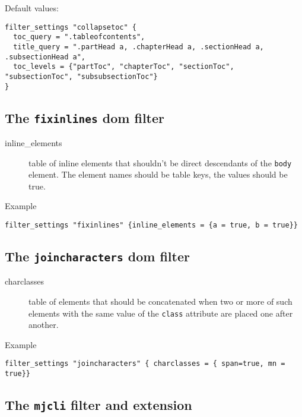 Default values:

\begin{verbatim}
filter_settings "collapsetoc" {
  toc_query = ".tableofcontents",
  title_query = ".partHead a, .chapterHead a, .sectionHead a, .subsectionHead a",
  toc_levels = {"partToc", "chapterToc", "sectionToc", "subsectionToc", "subsubsectionToc"}
}
\end{verbatim}

\hypertarget{the-fixinlines-dom-filter}{%
\subsection{\texorpdfstring{The \texttt{fixinlines} dom
filter}{The fixinlines dom filter}}\label{the-fixinlines-dom-filter}}

\begin{description}
\item[inline\_elements]
table of inline elements that shouldn't be direct descendants of the
\texttt{body} element. The element names should be table keys, the
values should be true.
\end{description}

Example

\begin{verbatim}
filter_settings "fixinlines" {inline_elements = {a = true, b = true}}
\end{verbatim}

\hypertarget{the-joincharacters-dom-filter}{%
\subsection{\texorpdfstring{The \texttt{joincharacters} dom
filter}{The joincharacters dom filter}}\label{the-joincharacters-dom-filter}}

\begin{description}
\item[charclasses]
table of elements that should be concatenated when two or more of such
elements with the same value of the \texttt{class} attribute are placed
one after another.
\end{description}

Example

\begin{verbatim}
filter_settings "joincharacters" { charclasses = { span=true, mn = true}}
\end{verbatim}

\hypertarget{mathjaxsettings}{%
\subsection{\texorpdfstring{The \texttt{mjcli} filter and
extension}{The mjcli filter and extension}}\label{mathjaxsettings}}


